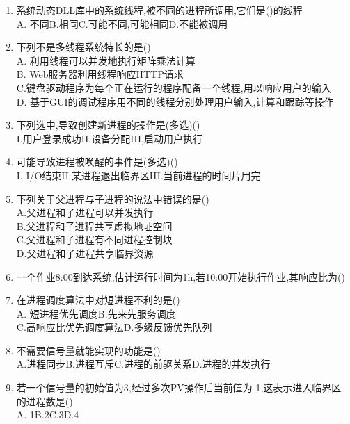 \documentclass[12pt, a4paper, oneside, UTF8]{ctexbook}
\begin{document}
\begin{enumerate}
    \item 系统动态DLL库中的系统线程,被不同的进程所调用,它们是()的线程 \\
    A. 不同\qquad B.相同\qquad C.可能不同,可能相同\qquad D.不能被调用

    \item 下列不是多线程系统特长的是() \\
    A. 利用线程可以并发地执行矩阵乘法计算 \\
    B. Web服务器利用线程响应HTTP请求 \\
    C.键盘驱动程序为每个正在运行的程序配备一个线程,用以响应用户的输入 \\
    D. 基于GUI的调试程序用不同的线程分别处理用户输入,计算和跟踪等操作

    \item 下列选中,导致创建新进程的操作是(多选)() \\
    I.用户登录成功\qquad II.设备分配\qquad III,启动用户执行

    \item 可能导致进程被唤醒的事件是(多选)() \\
    I. I/O结束\qquad II.某进程退出临界区\qquad III.当前进程的时间片用完 

    \item 下列关于父进程与子进程的说法中错误的是() \\
    A.父进程和子进程可以并发执行 \\
    B.父进程和子进程共享虚拟地址空间 \\
    C.父进程和子进程有不同进程控制块 \\
    D.父进程和子进程共享临界资源

    \item 一个作业8:00到达系统,估计运行时间为1h,若10:00开始执行作业,其响应比为()

    \item 在进程调度算法中对短进程不利的是() \\
    A. 短进程优先调度\qquad B.先来先服务调度 \\
    C.高响应比优先调度算法\qquad D.多级反馈优先队列

    \item 不需要信号量就能实现的功能是() \\
    A.进程同步\qquad B.进程互斥\qquad C.进程的前驱关系\qquad D.进程的并发执行

    \item 若一个信号量的初始值为3,经过多次PV操作后当前值为-1,这表示进入临界区的进程数是() \\
    A. 1\qquad B.2\qquad C.3\qquad D.4


\end{enumerate}
\end{document}
